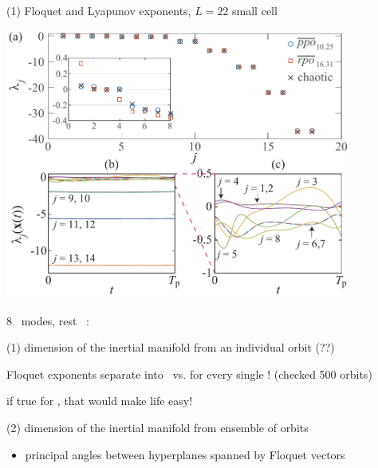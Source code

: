 \begin{frame}{(1) Floquet and Lyapunov exponents, $L=22$ small cell}
\begin{center}
\includegraphics[width=0.85\textwidth]{../../dimension/ks22FloqExp}
\end{center}
8 \entangled\ modes, rest \transient\  :

\hfill \color{red}{inertial manifold is 8 dimensional!}
\end{frame}

\begin{frame}{(1) dimension of the inertial manifold from an individual orbit (??)}
\begin{block}{
   Floquet exponents separate into \entangled\ vs. \transient}
for every single \po! (checked 500 orbits)
\end{block}

\bigskip\bigskip

if true for \NS, that would make life easy!
\end{frame}


\begin{frame}{(2) dimension of the inertial manifold from ensemble of orbits}

\bigskip

\begin{itemize}
  \item principal angles between hyperplanes spanned by Floquet vectors
\end{itemize}
\end{frame}

